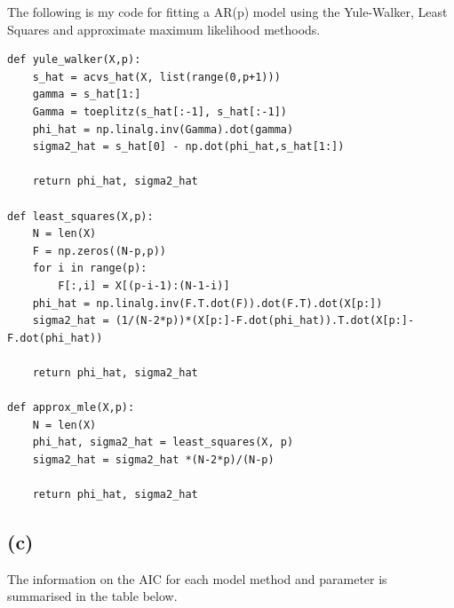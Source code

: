 \documentclass[a4paper,11pt]{article}
\theoremstyle{mytheor}
\begin{document}
The following is my code for fitting a AR(p) model using the Yule-Walker, Least Squares and approximate maximum likelihood methoods. 

\begin{lstlisting}
def yule_walker(X,p):
    s_hat = acvs_hat(X, list(range(0,p+1)))
    gamma = s_hat[1:]
    Gamma = toeplitz(s_hat[:-1], s_hat[:-1])
    phi_hat = np.linalg.inv(Gamma).dot(gamma)
    sigma2_hat = s_hat[0] - np.dot(phi_hat,s_hat[1:])
    
    return phi_hat, sigma2_hat

def least_squares(X,p):
    N = len(X)
    F = np.zeros((N-p,p))
    for i in range(p):
        F[:,i] = X[(p-i-1):(N-1-i)]
    phi_hat = np.linalg.inv(F.T.dot(F)).dot(F.T).dot(X[p:])
    sigma2_hat = (1/(N-2*p))*(X[p:]-F.dot(phi_hat)).T.dot(X[p:]-F.dot(phi_hat))
    
    return phi_hat, sigma2_hat

def approx_mle(X,p):
    N = len(X)
    phi_hat, sigma2_hat = least_squares(X, p)
    sigma2_hat = sigma2_hat *(N-2*p)/(N-p)
    
    return phi_hat, sigma2_hat
\end{lstlisting}

\subsection*{(c)}

The information on the AIC for each model method and parameter is summarised in the table below. \\
\end{document}
